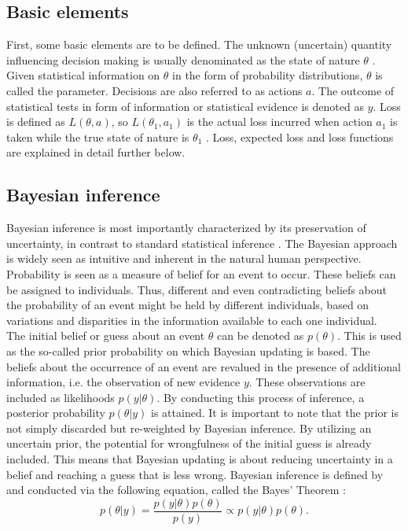 	    \subsection{Basic elements}
	    First, some basic elements are to be defined. The unknown (uncertain) quantity influencing decision making is usually denominated as the state of nature $\theta$ \citep{berger2013stat}. Given statistical information on $\theta$ in the form of probability distributions, $\theta$ is called the parameter. 
	    Decisions are also referred to as actions $a$.
	    The outcome of statistical tests in form of information or statistical evidence is denoted as $y$.	    
	    Loss is defined as $L(\theta,a)$, so $L(\theta_1,a_1)$ is the actual loss incurred when action $a_1$ is taken while the true state of nature is $\theta_1$ \citep{berger2013stat}. Loss, expected loss and loss functions are explained in detail further below.  
        
        \subsection{Bayesian inference}
        Bayesian inference is most importantly characterized by its preservation of uncertainty, in contrast to standard statistical inference \citep{jaynes2003probability, gelman2014bayesian, box2011bayesian, harney2013bayesian, davidson2015}. The Bayesian approach is widely seen as intuitive and inherent in the natural human perspective. Probability is seen as a measure of belief for an event to occur. These beliefs can be assigned to individuals. Thus, different and even contradicting beliefs about the probability of an event might be held by different individuals, based on variations and disparities in the information available to each one individual.\\
        The initial belief or guess about an event $\theta$ can be denoted as $p(\theta)$. This is used as the so-called prior probability on which Bayesian updating is based. The beliefs about the occurrence of an event are revalued in the presence of additional information, i.e. the observation of new evidence $y$. These observations are included as likelihoods $p(y|\theta)$. By conducting this process of inference, a posterior probability $p(\theta|y)$ is attained. It is important to note that the prior is not simply discarded but re-weighted by Bayesian inference. By utilizing an uncertain prior, the potential for wrongfulness of the initial guess is already included. This means that Bayesian updating is about reducing uncertainty in a belief and reaching a guess that is less wrong. Bayesian inference is defined by and conducted via the following equation, called the Bayes' Theorem \citep{jaynes2003probability, gelman2014bayesian, box2011bayesian, harney2013bayesian, davidson2015}:
        \begin{equation}\label{eq:BayesTheorem}
        p(\theta|y) = \frac{p(y|\theta)p(\theta)}{p(y)}
        \propto p(y|\theta)p(\theta).
        \end{equation}
                
